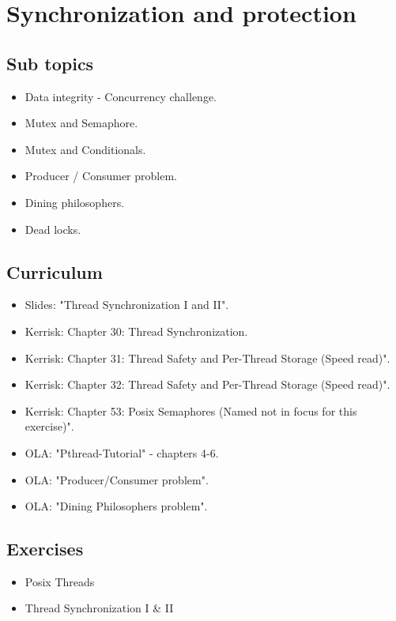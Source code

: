 \section{Synchronization and protection}

\subsection{Sub topics}

\begin{itemize}
	\item Data integrity - Concurrency challenge.
	\item Mutex and Semaphore.
	\item Mutex and Conditionals.
	\item Producer / Consumer problem.
	\item Dining philosophers.
	\item Dead locks.
\end{itemize}

\subsection{Curriculum}

\begin{itemize}
	\item Slides: "Thread Synchronization I and II".
	\item Kerrisk: Chapter 30: Thread Synchronization.
	\item Kerrisk: Chapter 31: Thread Safety and Per-Thread Storage (Speed read)".
	\item Kerrisk: Chapter 32: Thread Safety and Per-Thread Storage (Speed read)".
	\item Kerrisk: Chapter 53: Posix Semaphores (Named not in focus for this exercise)".
	\item OLA: "Pthread-Tutorial" - chapters 4-6.
	\item OLA: "Producer/Consumer problem".
	\item OLA: "Dining Philosophers problem".
\end{itemize}

\subsection{Exercises}

\begin{itemize}
	\item Posix Threads
	\item Thread Synchronization I \& II
\end{itemize}

